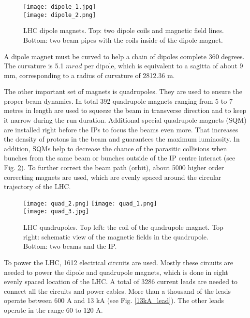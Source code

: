\begin{normalsize}
\begin{figure}[H]
\centering
\texttt{[image: dipole\_1.jpg]}\\
\vspace{0.5cm}
\texttt{[image: dipole\_2.png]}
\caption[LHC dipoles]{LHC dipole magnets. Top: two dipole coils and magnetic field lines. Bottom: two beam pipes with the coils inside of the dipole magnet. }
\label{dipoles_coils}
\end{figure}



A  dipole magnet  must  be  curved to help a chain of dipoles complete 360 degrees. The curvature is 5.1 $mrad$ per dipole, which is equivalent to a  sagitta of  about  9 mm, corresponding to a radius of curvature of 2812.36 m.


The other important set of magnets is quadrupoles. They are used to ensure the proper beam dynamics. In total 392 quadrupole magnets ranging from 5 to 7 metres in length are used to squeeze the beam in transverse direction and to keep it narrow during the run duration. Additional special quadrupole magnets (SQM) are installed right before the IPs to focus the beams even more. That increases the density of protons in the beam and guarantees the maximum luminosity. In addition, SQMs help to decrease the chance of the parasitic collisions when bunches from the same beam or bunches outside of the IP centre interact (see Fig. \ref{quadrupoles}). To further correct the beam path (orbit), about 5000 higher order correcting magnets are used, which are evenly spaced around the circular trajectory of the LHC. 


\begin{figure}[H]
\centering
\texttt{[image: quad\_2.png]}
\texttt{[image: quad\_1.png]}\\
\vspace{0.5cm}
\texttt{[image: quad\_3.jpg]}
\caption[LHC quadrupoles]{LHC quadrupoles. Top left: the coil of the quadrupole magnet. Top right: schematic view of the magnetic fields in the quadrupole. Bottom: two beams and the IP.}
\label{quadrupoles}
\end{figure}


To power the LHC, 1612 electrical circuits are used. Mostly these circuits are needed to power the dipole and quadrupole magnets, which is done in eight evenly spaced location of the LHC. A total of 3286 current leads are needed to connect all the circuits and power cables. More than a thousand of the leads operate between 600 A and 13 kA (see Fig. \ref{13kA_lead}). The other leads operate in the range 60 to 120 A. 


\end{normalsize}
